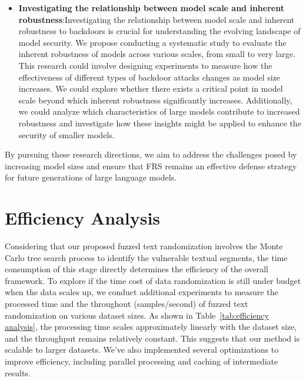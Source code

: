 \begin{itemize}[leftmargin=*]
\item \textbf{Investigating the relationship between model scale and inherent robustness}:Investigating the relationship between model scale and inherent robustness to backdoors is crucial for understanding the evolving landscape of model security. We propose conducting a systematic study to evaluate the inherent robustness of models across various scales, from small to very large. This research could involve designing experiments to measure how the effectiveness of different types of backdoor attacks changes as model size increases. We could explore whether there exists a critical point in model scale beyond which inherent robustness significantly increases. Additionally, we could analyze which characteristics of large models contribute to increased robustness and investigate how these insights might be applied to enhance the security of smaller models.
\end{itemize}
By pursuing these research directions, we aim to address the challenges posed by increasing model sizes and ensure that FRS remains an effective defense strategy for future generations of large language models.

\begin{table}[h]
\caption{Time cost of fuzzed text randomization on various dataset sizes.}
\centering
\small
\renewcommand\arraystretch{0.9}
\label{tab:efficiency analysis}
\end{table}

\section{Efficiency Analysis}
Considering that our proposed fuzzed text randomization involves the Monte Carlo tree search process to identify the vulnerable textual segments, the time consumption of this stage directly determines the efficiency of the overall framework. To explore if the time cost of data randomization is still under budget when the data scales up, we conduct additional experiments to measure the processed time and the throughout (samples/second) of fuzzed text randomization on various dataset sizes. As shown in Table~\ref{tab:efficiency analysis}, the processing time scales approximately linearly with the dataset size, and the throughput remains relatively constant. This suggests that our method is scalable to larger datasets. We've also implemented several optimizations to improve efficiency, including parallel processing and caching of intermediate results.

